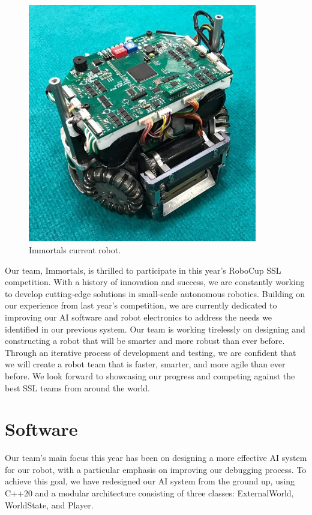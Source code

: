 \documentclass[runningheads]{llncs}
\begin{document}
\begin{figure}
\centering
\includegraphics[width=10cm]{images/std_robot.jpeg}
\caption{Immortals current robot.} \label{fig_std_robot}
\end{figure}

Our team, Immortals, is thrilled to participate in this year's RoboCup SSL competition. With a history of innovation and success, we are constantly working to develop cutting-edge solutions in small-scale autonomous robotics. Building on our experience from last year's competition, we are currently dedicated to improving our AI software and robot electronics to address the needs we identified in our previous system. Our team is working tirelessly on designing and constructing a robot that will be smarter and more robust than ever before. Through an iterative process of development and testing, we are confident that we will create a robot team that is faster, smarter, and more agile than ever before. We look forward to showcasing our progress and competing against the best SSL teams from around the world.



\section{Software}
Our team's main focus this year has been on designing a more effective AI system for our robot, with a particular emphasis on improving our debugging process. To achieve this goal, we have redesigned our AI system from the ground up, using C++20 and a modular architecture consisting of three classes: ExternalWorld, WorldState, and Player.
\end{document}
